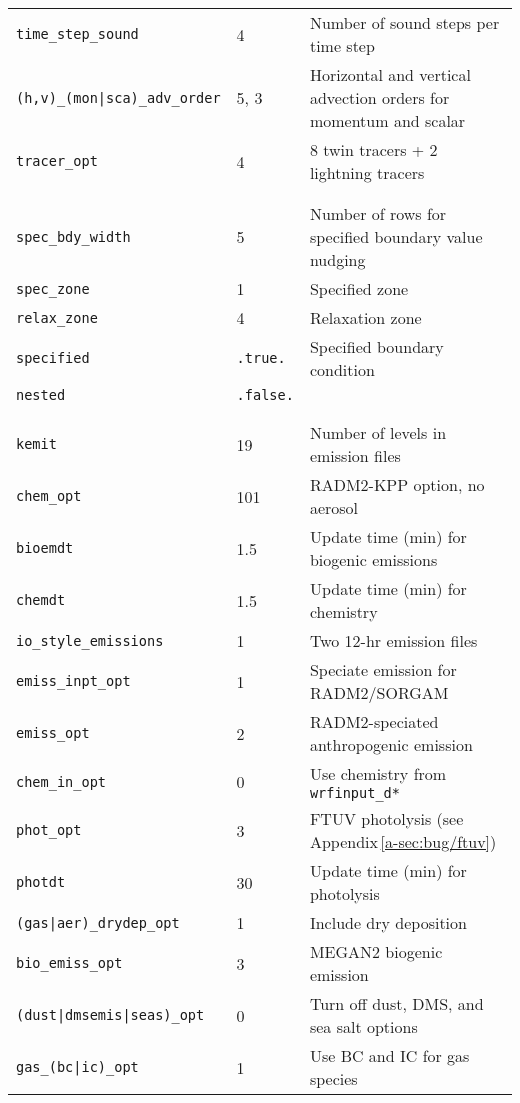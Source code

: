 \begin{singlespacing}
\begin{longtable}{p{2.0in}p{1.1in}p{3.0in}}
{\tt time\_step\_sound} & 4 & Number of sound steps per time step \\
{\tt (h,v)\_(mon|sca)\_adv\_order} & 5, 3 & Horizontal and vertical advection orders for momentum and scalar \\
{\tt tracer\_opt} & 4 & 8 twin tracers + 2 lightning tracers \\
\\
\hspace{-.2in}{\tt \&bdy\_control} \\
{\tt spec\_bdy\_width} & 5 & Number of rows for specified boundary value nudging \\
{\tt spec\_zone} & 1 & Specified zone \\
{\tt relax\_zone} & 4 & Relaxation zone \\
{\tt specified} & {\tt .true.} & Specified boundary condition \\
{\tt nested} & {\tt .false.} \\
\\
\hspace{-.2in}{\tt \&chem} \\
{\tt kemit} & 19 & Number of levels in emission files \\
{\tt chem\_opt} & 101 & RADM2-KPP option, no aerosol \\
{\tt bioemdt} & 1.5 & Update time (\unit{min}) for biogenic emissions \\
{\tt chemdt} & 1.5 & Update time (\unit{min}) for chemistry \\
{\tt io\_style\_emissions} & 1 & Two 12-hr emission files \\
{\tt emiss\_inpt\_opt} & 1 & Speciate emission for RADM2/SORGAM \\
{\tt emiss\_opt} & 2 & RADM2-speciated anthropogenic emission \\
{\tt chem\_in\_opt} & 0 & Use chemistry from \texttt{wrfinput\_d*} \\
{\tt phot\_opt} & 3 & FTUV photolysis (see Appendix\,\ref{a-sec:bug/ftuv})\\
{\tt photdt} & 30 & Update time (\unit{min}) for photolysis \\
{\tt (gas|aer)\_drydep\_opt} & 1 & Include dry deposition \\
{\tt bio\_emiss\_opt} & 3 & MEGAN2 biogenic emission \\
{\tt (dust|dmsemis|seas)\_opt} & 0 & Turn off dust, DMS, and sea salt options \\
{\tt gas\_(bc|ic)\_opt} & 1 & Use BC and IC for gas species \\

\end{longtable}
\end{singlespacing}
